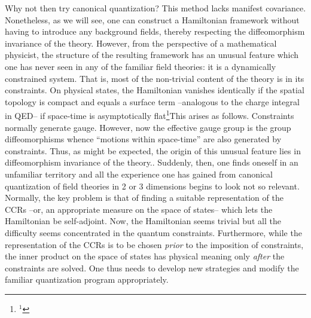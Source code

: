 Why not then try canonical quantization? This method lacks manifest
covariance. Nonetheless, as we will see, one can construct a Hamiltonian
framework without having to introduce any background fields, thereby
respecting the diffeomorphism invariance of the theory. However, from the
perspective of a mathematical physicist, the structure of the resulting
framework has an unusual feature which one has never seen in
any of the familiar field theories: it is a dynamically constrained system.
That is, most of the non-trivial content of the theory is in its constraints.
On physical states, the Hamiltonian vanishes identically if the spatial
topology is compact and equals a surface term --analogous to the charge
integral in QED-- if space-time is asymptotically flat\footnote{$^1$}{This arises as follows. Constraints normally generate gauge.
However, now the effective gauge group is the group diffeomorphisms whence
``motions within space-time'' are also generated by constraints. Thus, as
might be expected, the origin of this unusual feature lies in diffeomorphism
invariance of the theory.}. Suddenly, then, one finds oneself
in an unfamiliar territory and all the experience one has gained from
canonical quantization of field theories in 2 or 3 dimensions begins to
look not so relevant. Normally, the key problem is that of finding a suitable
representation of the CCRs --or, an appropriate measure on the space of
states-- which lets the Hamiltonian be self-adjoint. Now, the Hamiltonian
seems trivial but all the difficulty seems concentrated in the quantum
constraints. Furthermore, while the representation of the CCRs is to be
chosen {\it prior} to the imposition of constraints, the inner product on
the space of states has physical meaning only {\it after} the constraints
are solved. One thus needs to develop new strategies and modify the familiar
quantization program appropriately.

